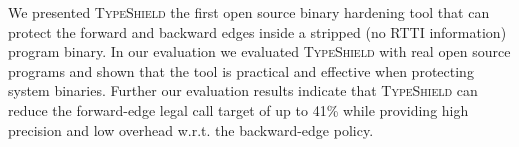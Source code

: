 
We presented \textsc{TypeShield} the first open source binary 
hardening tool that can protect the forward and backward edges 
inside a stripped (no RTTI information) program binary. In our evaluation we evaluated
\textsc{TypeShield} with real open source programs and shown that the 
tool is practical and effective when protecting system binaries.
Further our evaluation results indicate that \textsc{TypeShield} can reduce the forward-edge legal 
call target of up to 41\% while providing high precision and low overhead
w.r.t. the backward-edge policy.


